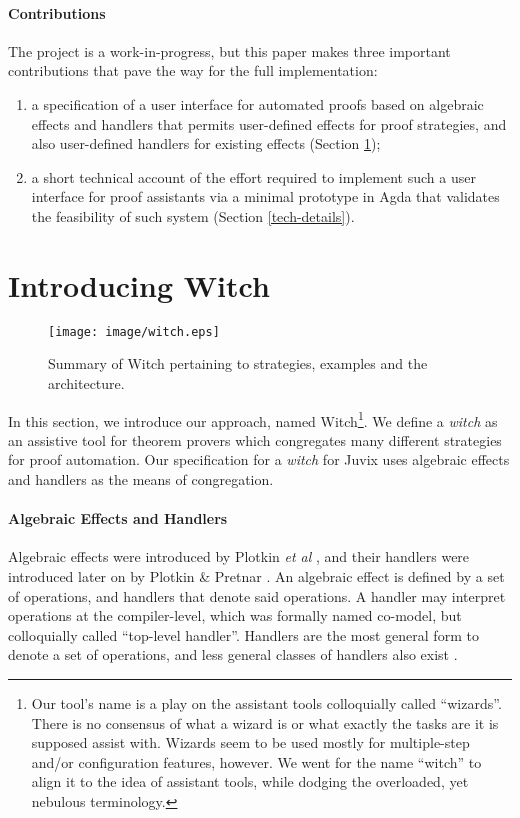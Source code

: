 \documentclass[sigconfl]{acmart}
\begin{document}
\paragraph{Contributions} The project is a work-in-progress, but this paper
makes three important contributions that pave the way for the full implementation:
\begin{enumerate}
\item a specification of a user interface for automated proofs based on
  algebraic effects and handlers that permits user-defined effects for proof
  strategies, and also user-defined handlers for existing effects (Section \ref{intro-witch});
\item a short technical account of the effort required to implement such a
  user interface for proof assistants via a minimal prototype in Agda that
  validates the feasibility of such system  (Section \ref{tech-details}).
\end{enumerate}

\section{Introducing Witch} \label{intro-witch}

\begin{figure}[!ht]
   \centering
    \texttt{[image: image/witch.eps]}
    \caption{Summary of Witch pertaining to strategies, examples
      and the architecture.}
    \label{fig:prototype}
\end{figure}

In this section, we introduce our approach, named Witch\footnote{Our tool's name is
  a play on the assistant tools colloquially called ``wizards''. There is no
  consensus of what a wizard is or what exactly the tasks are it is supposed
  assist with. Wizards seem to be used mostly for multiple-step and/or
  configuration features, however. We went for the name ``witch'' to align it to
  the idea of assistant tools, while dodging the overloaded, yet nebulous
  terminology.}. We define a \textit{witch} as an assistive tool for theorem
provers which congregates many different strategies for proof automation. Our
specification for a \textit{witch} for Juvix uses algebraic effects and handlers
as the means of congregation.

\paragraph{Algebraic Effects and Handlers} Algebraic effects were introduced by
Plotkin \textit{et al} \cite{Plotkin2003}, and their handlers were introduced later on by
Plotkin \& Pretnar \cite{Plotkin2013}. An
algebraic effect is defined by a set of
operations, and handlers that denote said operations. A handler may interpret
operations at the compiler-level, which was formally named co-model, but
colloquially called ``top-level handler''. Handlers are the most general form to
denote a set of operations, and less general classes of handlers also exist
\cite{DBLP:conf/esop/AhmanB20}.
\end{document}

